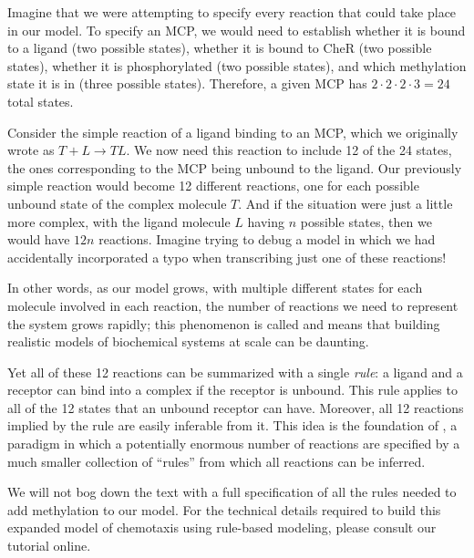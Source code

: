 Imagine that we were attempting to specify every reaction that could take place in our model. To specify an MCP, we would need to establish whether it is bound to a ligand (two possible states), whether it is bound to CheR (two possible states), whether it is phosphorylated (two possible states), and which methylation state it is in (three possible states). Therefore, a given MCP has $2 \cdot 2 \cdot 2 \cdot 3 = 24$ total states.

Consider the simple reaction of a ligand binding to an MCP, which we originally wrote as $T + L \rightarrow TL$. We now need this reaction to include 12 of the 24 states, the ones corresponding to the MCP being unbound to the ligand. Our previously simple reaction would become 12 different reactions, one for each possible unbound state of the complex molecule $T$. And if the situation were just a little more complex, with the ligand molecule $L$ having $n$ possible states, then we would have $12n$ reactions. Imagine trying to debug a model in which we had accidentally incorporated a typo when transcribing just one of these reactions!

In other words, as our model grows, with multiple different states for each molecule involved in each reaction, the number of reactions we need to represent the system grows rapidly; this phenomenon is called  and means that building realistic models of biochemical systems at scale can be daunting.

Yet all of these 12 reactions can be summarized with a single \textit{rule}: a ligand and a receptor can bind into a complex if the receptor is unbound. This rule applies to all of the 12 states that an unbound receptor can have. Moreover, all 12 reactions implied by the rule are easily inferable from it. This idea is the foundation of , a paradigm in which a potentially enormous number of reactions are specified by a much smaller collection of ``rules'' from which all reactions can be inferred. 

We will not bog down the text with a full specification of all the rules needed to add methylation to our model. For the technical details required to build this expanded model of chemotaxis using rule-based modeling, please consult our tutorial online.

